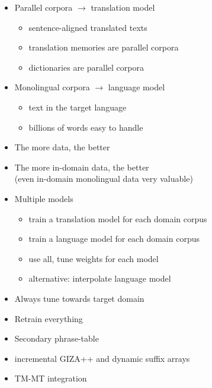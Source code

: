 \documentclass[landscape]{uedslides2C}
\begin{document}

\vspace{15mm}
\begin{itemize}
\item Parallel corpora $\rightarrow$ translation model
\begin{itemize}
\item sentence-aligned translated texts
\item translation memories are parallel corpora
\item dictionaries are parallel corpora
\end{itemize}
\item Monolingual corpora $\rightarrow$ language model
\begin{itemize}
\item text in the target language
\item billions of words easy to handle
\end{itemize}
\end{itemize}


\vspace{10mm}
\begin{itemize}
\item The more data, the better
\item The more in-domain data, the better\\
(even in-domain monolingual data very valuable)
\item Multiple models 
\begin{itemize}
\item train a translation model for each domain corpus
\item train a language model for each domain corpus
\item use all, tune weights for each model
\item alternative: interpolate language model
\end{itemize}
\item Always tune towards target domain
\end{itemize}


\begin{itemize}
\item Retrain everything
\item Secondary phrase-table
\item  incremental GIZA++ and dynamic suffix arrays
\item TM-MT integration

\end{itemize}
\end{document}
